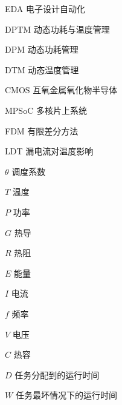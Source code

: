 
\begin{denotation}

\item[EDA] 电子设计自动化
\item[DPTM] 动态功耗与温度管理
\item[DPM]	动态功耗管理
\item[DTM]  动态温度管理
\item[CMOS]	互氧金属氧化物半导体
\item[MPSoC]	多核片上系统
\item[FDM]	有限差分方法
\item[LDT]	漏电流对温度影响
\item [$\theta$] 调度系数
\item[$T$] 温度
\item[$P$] 功率
\item[$G$] 热导
\item[$R$] 热阻
\item[$E$] 能量
\item[$I$] 电流
\item[$f$] 频率
\item[$V$] 电压
\item[$C$] 热容
\item[$D$] 任务分配到的运行时间
\item[$W$] 任务最坏情况下的运行时间

\end{denotation}
